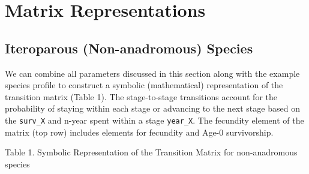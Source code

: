 \documentclass[
  letterpaper,
  DIV=11,
  numbers=noendperiod]{scrreprt}
\begin{document}
\section{Matrix Representations}\label{matrix-representations}

\subsection{Iteroparous (Non-anadromous)
Species}\label{iteroparous-non-anadromous-species}

We can combine all parameters discussed in this section along with the
example species profile to construct a symbolic (mathematical)
representation of the transition matrix (Table 1). The stage-to-stage
transitions account for the probability of staying within each stage or
advancing to the next stage based on the \texttt{surv\_X} and n-year
spent within a stage \texttt{year\_X}. The fecundity element of the
matrix (top row) includes elements for fecundity and Age-0 survivorship.

\label{07_life_cycle_model-07_life_cycle_model-07_life_cycle_model-07_life_cycle_model-07_life_cycle_model-tbl:transition-matrix}
Table 1. Symbolic Representation of the Transition Matrix for
non-anadromous species
\end{document}
